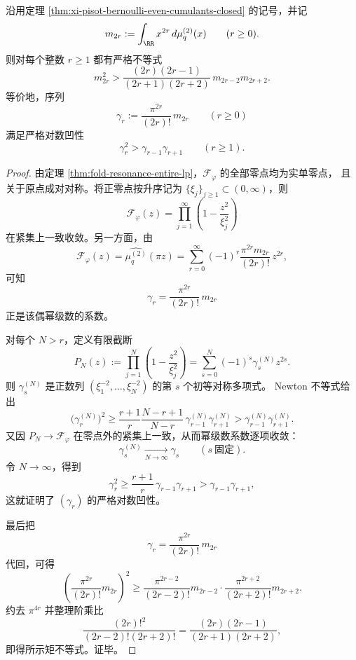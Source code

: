 \begin{theorem}\label{thm:xi-pisot-bernoulli-even-moment-turan-newton}
沿用定理 \ref{thm:xi-pisot-bernoulli-even-cumulants-closed} 的记号，并记
\[
m_{2r}:=\int_{\RR}x^{2r}\,d\mu_q^{(2)}(x)
\qquad (r\ge 0).
\]
则对每个整数 \(r\ge 1\) 都有严格不等式
\[
\boxed{\;
m_{2r}^2
>
\frac{(2r)(2r-1)}{(2r+1)(2r+2)}\,
m_{2r-2}m_{2r+2}.\;}
\]
等价地，序列
\[
\gamma_r:=\frac{\pi^{2r}}{(2r)!}\,m_{2r}
\qquad (r\ge 0)
\]
满足严格对数凹性
\[
\gamma_r^2>\gamma_{r-1}\gamma_{r+1}
\qquad (r\ge 1).
\]
\end{theorem}
\begin{proof}
由定理 \ref{thm:fold-resonance-entire-lp}，\(\mathcal F_\varphi\) 的全部零点均为实单零点，
且关于原点成对对称。将正零点按升序记为 \(\{\xi_j\}_{j\ge 1}\subset (0,\infty)\)，则
\[
\mathcal F_\varphi(z)=\prod_{j=1}^{\infty}\left(1-\frac{z^2}{\xi_j^2}\right)
\]
在紧集上一致收敛。另一方面，由
\[
\mathcal F_\varphi(z)=\widehat{\mu_q^{(2)}}(\pi z)
=
\sum_{r=0}^{\infty}(-1)^r\frac{\pi^{2r}m_{2r}}{(2r)!}\,z^{2r},
\]
可知
\[
\gamma_r=\frac{\pi^{2r}}{(2r)!}\,m_{2r}
\]
正是该偶幂级数的系数。

对每个 \(N>r\)，定义有限截断
\[
P_N(z):=\prod_{j=1}^{N}\left(1-\frac{z^2}{\xi_j^2}\right)
=
\sum_{s=0}^{N}(-1)^s\gamma_s^{(N)}z^{2s}.
\]
则 \(\gamma_s^{(N)}\) 是正数列 \((\xi_1^{-2},\dots,\xi_N^{-2})\) 的第 \(s\) 个初等对称多项式。
Newton 不等式给出
\[
\bigl(\gamma_r^{(N)}\bigr)^2
\ge
\frac{r+1}{r}\frac{N-r+1}{N-r}\,
\gamma_{r-1}^{(N)}\gamma_{r+1}^{(N)}
>
\gamma_{r-1}^{(N)}\gamma_{r+1}^{(N)}.
\]
又因 \(P_N\to \mathcal F_\varphi\) 在零点外的紧集上一致，从而幂级数系数逐项收敛：
\[
\gamma_s^{(N)}\xrightarrow[N\to\infty]{}\gamma_s
\qquad (s\ \text{固定}).
\]
令 \(N\to\infty\)，得到
\[
\gamma_r^2\ge \frac{r+1}{r}\,\gamma_{r-1}\gamma_{r+1}
>
\gamma_{r-1}\gamma_{r+1},
\]
这就证明了 \((\gamma_r)\) 的严格对数凹性。

最后把
\[
\gamma_r=\frac{\pi^{2r}}{(2r)!}\,m_{2r}
\]
代回，可得
\[
\left(\frac{\pi^{2r}}{(2r)!}m_{2r}\right)^2
\ge
\frac{\pi^{2r-2}}{(2r-2)!}m_{2r-2}\cdot
\frac{\pi^{2r+2}}{(2r+2)!}m_{2r+2}.
\]
约去 \(\pi^{4r}\) 并整理阶乘比
\[
\frac{(2r)!^2}{(2r-2)!(2r+2)!}
=
\frac{(2r)(2r-1)}{(2r+1)(2r+2)},
\]
即得所示矩不等式。证毕。
\end{proof}


